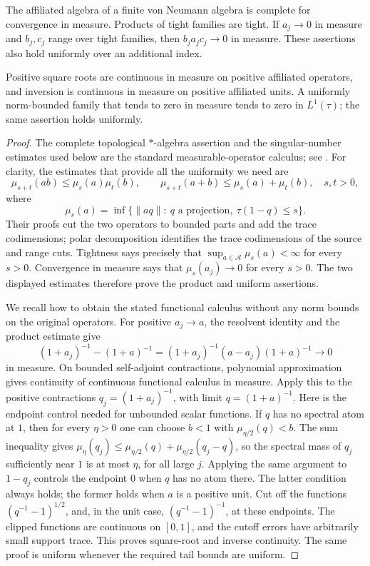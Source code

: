 \begin{lemma}\label{coeff:analytic-calculus}
The affiliated algebra of a finite von Neumann algebra is complete for
convergence in measure.  Products of tight families are tight.  If
\(a_j\to0\) in measure and \(b_j,c_j\) range over tight families, then
\(b_ja_jc_j\to0\) in measure.  These assertions also hold uniformly over
an additional index.

Positive square roots are continuous in measure on positive affiliated
operators, and inversion is continuous in measure on positive affiliated
units.  A uniformly norm-bounded family that tends to zero in measure
tends to zero in \(L^1(\tau)\); the same assertion holds uniformly.
\end{lemma}

\begin{proof}
The complete topological \(*\)-algebra assertion and the singular-number
estimates used below are the standard measurable-operator calculus;
see \cite[Sections~1.4--1.5, Lemma~2.5 and Lemma~3.1]{FackKosaki1986}.
For clarity, the estimates that provide all the uniformity we need are
\[
 \mu_{s+t}(ab)\le \mu_s(a)\mu_t(b),\qquad
 \mu_{s+t}(a+b)\le \mu_s(a)+\mu_t(b),
 \quad s,t>0,
\]
where
\[
 \mu_s(a)=
 \inf\{\|aq\|:\ q\text{ a projection},\ \tau(1-q)\le s\}.
\]
Their proofs cut the two operators to bounded parts and add the
trace codimensions; polar decomposition identifies the trace
codimensions of the source and range cuts.  Tightness says precisely
that \(\sup_{a\in\mathcal A}\mu_s(a)<\infty\) for every \(s>0\).
Convergence in measure says that \(\mu_s(a_j)\to0\) for every \(s>0\).
The two displayed estimates therefore prove the product and uniform
assertions.

We recall how to obtain the stated functional calculus without any
norm bounds on the original operators.  For positive \(a_j\to a\),
the resolvent identity and the product estimate give
\[
 (1+a_j)^{-1}-(1+a)^{-1}
 =(1+a_j)^{-1}(a-a_j)(1+a)^{-1}\longrightarrow0
\]
in measure.  On bounded self-adjoint contractions, polynomial
approximation gives continuity of continuous functional calculus in
measure.  Apply this to the positive contractions
\(q_j=(1+a_j)^{-1}\), with limit \(q=(1+a)^{-1}\).
Here is the endpoint control needed for unbounded scalar functions.
If \(q\) has no spectral atom at \(1\), then for every \(\eta>0\)
one can choose \(b<1\) with \(\mu_{\eta/2}(q)<b\).
The sum inequality gives
\(\mu_\eta(q_j)\le\mu_{\eta/2}(q)+\mu_{\eta/2}(q_j-q)\),
so the spectral mass of \(q_j\) sufficiently near \(1\) is at most
\(\eta\), for all large \(j\).  Applying the same argument to
\(1-q_j\) controls the endpoint \(0\) when \(q\) has no atom there.
The latter condition always holds; the former holds when \(a\) is
a positive unit.  Cut off the functions
\((q^{-1}-1)^{1/2}\), and, in the unit case,
\((q^{-1}-1)^{-1}\), at these endpoints.  The clipped functions are
continuous on \([0,1]\), and the cutoff errors have arbitrarily small
support trace.  This proves square-root and inverse continuity.
The same proof is uniform whenever the required tail bounds are
uniform.


\end{proof}
